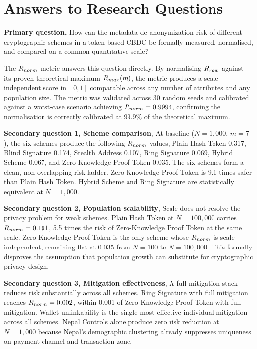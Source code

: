 \section{Answers to Research Questions}
\label{sec:answers}

\textbf{Primary question,} How can the metadata de-anonymization
risk of different cryptographic schemes in a token-based CBDC be
formally measured, normalised, and compared on a common
quantitative scale?

The $R_{norm}$ metric answers this question directly. By
normalising $R_{raw}$ against its proven theoretical maximum
$R_{max}(m)$, the metric produces a scale-independent score in
$[0, 1]$ comparable across any number of attributes and any
population size. The metric was validated across 30 random seeds
and calibrated against a worst-case scenario achieving
$R_{norm} = 0.9994$, confirming the normalisation is correctly
calibrated at 99.9\% of the theoretical maximum.

\textbf{Secondary question 1, Scheme comparison},
At baseline ($N = 1{,}000$, $m = 7$), the six schemes produce
the following $R_{norm}$ values, Plain Hash Token 0.317, Blind
Signature 0.174, Stealth Address 0.107, Ring Signature 0.069,
Hybrid Scheme 0.067, and Zero-Knowledge Proof Token 0.035. The six schemes form
a clean, non-overlapping risk ladder. Zero-Knowledge Proof Token is 9.1 times
safer than Plain Hash Token. Hybrid Scheme and Ring Signature
are statistically equivalent at $N = 1{,}000$.

\textbf{Secondary question 2, Population scalability},
Scale does not resolve the privacy problem for weak schemes.
Plain Hash Token at $N = 100{,}000$ carries $R_{norm} = 0.191$,
5.5 times the risk of Zero-Knowledge Proof Token at the same scale. Zero-Knowledge Proof Token
is the only scheme whose $R_{norm}$ is scale-independent, remaining
flat at 0.035 from $N = 100$ to $N = 100{,}000$. This formally
disproves the assumption that population growth can substitute
for cryptographic privacy design.

\textbf{Secondary question 3, Mitigation effectiveness},
A full mitigation stack reduces risk substantially across all
schemes. Ring Signature with full mitigation reaches
$R_{norm} = 0.002$, within 0.001 of Zero-Knowledge Proof Token with full mitigation.
Wallet unlinkability is the single most effective individual
mitigation across all schemes. Nepal Controls alone produce zero
risk reduction at $N = 1{,}000$ because Nepal's demographic
clustering already suppresses uniqueness on payment channel and
transaction zone.

